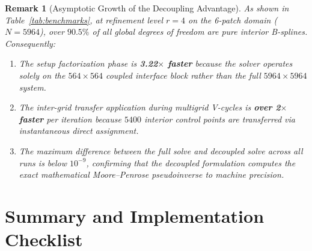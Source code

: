 \documentclass[11pt,a4paper]{article}
\newtheorem{remark}[theorem]{Remark}
\begin{document}
\begin{remark}[Asymptotic Growth of the Decoupling Advantage]
As shown in Table~\ref{tab:benchmarks}, at refinement level $r=4$ on the 6-patch domain ($N=5964$), over $90.5\%$ of all global degrees of freedom are pure interior B-splines. Consequently:
\begin{enumerate}
    \item The setup factorization phase is \textbf{3.22$\times$ faster} because the solver operates solely on the $564 \times 564$ coupled interface block rather than the full $5964 \times 5964$ system.
    \item The inter-grid transfer application during multigrid V-cycles is \textbf{over 2$\times$ faster} per iteration because $5400$ interior control points are transferred via instantaneous direct assignment.
    \item The maximum difference between the full solve and decoupled solve across all runs is below $10^{-9}$, confirming that the decoupled formulation computes the exact mathematical Moore--Penrose pseudoinverse to machine precision.
\end{enumerate}
\end{remark}

\section{Summary and Implementation Checklist}
\end{document}
